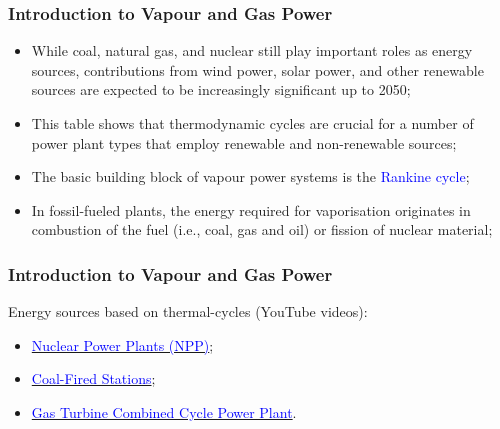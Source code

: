\documentclass[10pt,compress]{beamer}
\begin{document}
\begin{frame}
 \frametitle{Introduction to Vapour and Gas Power}

    \begin{itemize}%
     \item <1-> While coal, natural gas, and nuclear still play important roles as energy sources, contributions from wind power, solar power, and other renewable sources are expected to be increasingly significant up to 2050;
     \item <2-> This table shows that thermodynamic cycles are crucial for a number of power plant types that employ renewable and non-renewable sources;
     \item <3-> The basic building block of vapour power systems is the \textcolor{blue}{Rankine cycle};
     \item <4-> In fossil-fueled plants, the energy required for vaporisation originates in combustion of the fuel (i.e., coal, gas and oil) or fission of nuclear material;  
    \end{itemize}
 \normalsize
\end{frame}

\begin{frame}
 \frametitle{Introduction to Vapour and Gas Power}
Energy sources based on thermal-cycles (YouTube videos):
    \begin{itemize}%
     \item \href{http://www.youtube.com/watch?v=_UwexvaCMWA}{\textcolor{blue}{Nuclear Power Plants (NPP)}};
     \item \href{http://www.youtube.com/watch?v=0mjT8ETB128}{\textcolor{blue}{Coal-Fired Stations}};
     \item \href{http://www.youtube.com/watch?v=oi1TRbiE_Kw}{\textcolor{blue}{Gas Turbine Combined Cycle Power Plant}}.
    \end{itemize}
 \normalsize
\end{frame}
\end{document}
